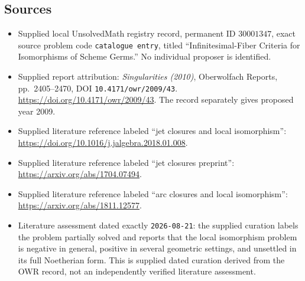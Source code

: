 \documentclass[11pt]{article}
\begin{document}
\subsection{Sources}
\begin{itemize}
\item Supplied local UnsolvedMath registry record, permanent ID \(30001347\), exact source problem code \texttt{catalogue entry}, titled ``Infinitesimal-Fiber Criteria for Isomorphisms of Scheme Germs.'' No individual proposer is identified.
\item Supplied report attribution: \emph{Singularities (2010)}, Oberwolfach Reports, pp.~2405--2470, DOI \texttt{10.4171/owr/2009/43}. \url{https://doi.org/10.4171/owr/2009/43}. The record separately gives proposed year 2009.
\item Supplied literature reference labeled ``jet closures and local isomorphism'': \url{https://doi.org/10.1016/j.jalgebra.2018.01.008}.
\item Supplied literature reference labeled ``jet closures preprint'': \url{https://arxiv.org/abs/1704.07494}.
\item Supplied literature reference labeled ``arc closures and local isomorphism'': \url{https://arxiv.org/abs/1811.12577}.
\item Literature assessment dated exactly \texttt{2026-08-21}: the supplied curation labels the problem partially solved and reports that the local isomorphism problem is negative in general, positive in several geometric settings, and unsettled in its full Noetherian form. This is supplied dated curation derived from the OWR record, not an independently verified literature assessment.
\end{itemize}
\end{document}
